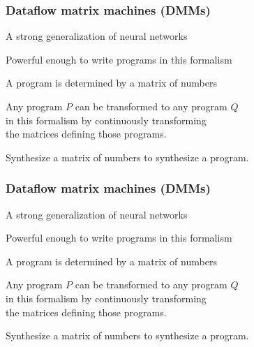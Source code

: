 \documentclass{beamer}
\newcommand{\msgray}[1]{{\color{mygray} #1}}
\begin{document}
\begin{frame}

\frametitle{Dataflow matrix machines (DMMs)}

\begin{itemize}

\item A strong generalization of neural networks\\[2ex]

\item Powerful enough  to write programs in this formalism\\[2ex]

\msgray{\item A program is determined by a matrix of numbers\\[2ex]

\item Any program $P$ can be transformed to any program $Q$\\ in this formalism
        by continuously transforming\\ the matrices defining those programs.\\[2ex]

\item Synthesize a matrix of numbers to synthesize a program.

}

\end{itemize}

\end{frame}

\begin{frame}

\frametitle{Dataflow matrix machines (DMMs)}

\begin{itemize}

\item A strong generalization of neural networks\\[2ex]

\item Powerful enough  to write programs in this formalism\\[2ex]

\item A program is determined by a matrix of numbers\\[2ex]

\msgray{\item Any program $P$ can be transformed to any program $Q$\\ in this formalism
        by continuously transforming\\ the matrices defining those programs.\\[2ex]

\item Synthesize a matrix of numbers to synthesize a program.

}

\end{itemize}

\end{frame}
\end{document}
